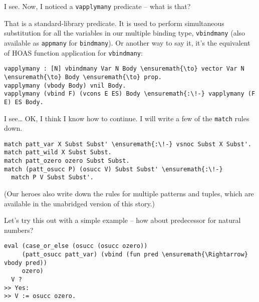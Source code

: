 \heroSTUDENT{} I see. Now, I noticed a \texttt{vapplymany} predicate -- what
is that?

\heroADVISOR{} That is a standard-library predicate. It is used to perform
simultaneous substitution for all the variables in our multiple binding
type, \texttt{vbindmany} (also available as \texttt{appmany} for
\texttt{bindmany}). Or another way to say it, it's the equivalent of
HOAS function application for \texttt{vbindmany}:

\begin{verbatim}
vapplymany : [N] vbindmany Var N Body \ensuremath{\to} vector Var N \ensuremath{\to} Body \ensuremath{\to} prop.
vapplymany (vbody Body) vnil Body.
vapplymany (vbind F) (vcons E ES) Body \ensuremath{:\!-} vapplymany (F E) ES Body.
\end{verbatim}

\heroSTUDENT{} I see\ldots{} OK, I think I know how to continue. I will write
a few of the \texttt{match} rules down.

\begin{verbatim}
match patt_var X Subst Subst' \ensuremath{:\!-} vsnoc Subst X Subst'.
match patt_wild X Subst Subst.
match patt_ozero ozero Subst Subst.
match (patt_osucc P) (osucc V) Subst Subst' \ensuremath{:\!-}
  match P V Subst Subst'.
\end{verbatim}

\begin{scenecomment}
(Our heroes also write down the rules for multiple patterns and tuples, which are
available in the unabridged version of this story.)
\end{scenecomment}

\heroSTUDENT{} Let's try this out with a simple example -- how about
predecessor for natural numbers?

\begin{verbatim}
eval (case_or_else (osucc (osucc ozero))
     (patt_osucc patt_var) (vbind (fun pred \ensuremath{\Rightarrow} vbody pred))
     ozero)
  V ?
>> Yes:
>> V := osucc ozero.
\end{verbatim}
